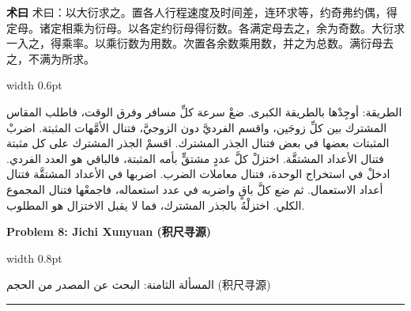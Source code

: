 \documentclass[11pt,a4paper]{article}
\newlength{\cnwidth}
\newlength{\arwidth}
\newcommand{\paralleltext}[2]{%
  \par\medskip\noindent
  \begin{minipage}[t]{\cnwidth}%
    \small #1%
  \end{minipage}%
  \hfill\textcolor{colrule}{\vrule width 0.6pt}\hfill
  \begin{minipage}[t]{\arwidth}%
    \small\arabicfont\beginR #2\endR%
  \end{minipage}%
  \par\medskip
}
\newcommand{\parallelsection}[2]{%
  \par\bigskip\noindent
  \begin{minipage}[t]{\cnwidth}%
    \Large\bfseries\color{sectioncolor} #1%
  \end{minipage}%
  \hfill\textcolor{colrule}{\vrule width 0.8pt}\hfill
  \begin{minipage}[t]{\arwidth}%
    \Large\arabicfontbf\color{sectioncolor}\beginR #2\endR%
  \end{minipage}%
  \par\medskip\noindent\textcolor{colrule}{\rule{\textwidth}{0.6pt}}\par\medskip
}
\newcommand{\cnlabel}[1]{\textbf{\color{notecolor}#1}}
\newcommand{\arlabel}[1]{\arabicfontbf\color{notecolor}\beginR #1\endR}
\begin{document}
\paralleltext{%
\cnlabel{术曰} 术曰：以大衍求之。置各人行程速度及时间差，连环求等，约奇弗约偶，得定母。诸定相乘为衍母。以各定约衍母得衍数。各满定母去之，余为奇数。大衍求一入之，得乘率。以乘衍数为用数。次置各余数乘用数，并之为总数。满衍母去之，不满为所求。%
}{%
\arlabel{الطريقة:} أوجِدْها بالطريقة الكبرى. ضعْ سرعة كلِّ مسافر وفرق الوقت، فاطلب المقاس المشترك بين كلِّ زوجَين، واقسم الفرديَّ دون الزوجيَّ، فتنال الأمَّهات المثبتة. اضربْ المثبتات بعضها في بعض فتنال الجذر المشترك. اقسمْ الجذر المشترك على كل مثبتة فتنال الأعداد المشتقَّة. اختزلْ كلَّ عددٍ مشتقٍّ بأمه المثبتة، فالباقي هو العدد الفردي. ادخلْ في استخراج الوحدة، فتنال معاملات الضرب. اضربها في الأعداد المشتقَّة فتنال أعداد الاستعمال. ثم ضع كلَّ باقٍ واضربه في عدد استعماله، فاجمعْها فتنال المجموع الكلي. اختزلْهُ بالجذر المشترك، فما لا يقبل الاختزال هو المطلوب.
}

\newpage

\parallelsection{Problem 8: Jichi Xunyuan (积尺寻源)}{المسألة الثامنة: البحث عن المصدر من الحجم (积尺寻源)}
\end{document}
